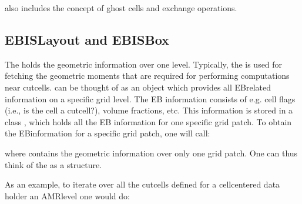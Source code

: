 \documentclass[letterpaper,10pt,english]{sphinxmanual}
\begin{document}
\sphinxAtStartPar
{} also includes the concept of ghost cells and exchange operations.


\subsection{EBISLayout and EBISBox}
\label{\detokenize{Source/ChomboBasics:ebislayout-and-ebisbox}}
\sphinxAtStartPar
The  holds the geometric information over one  level.
Typically, the  is used for fetching the geometric moments that are required for performing computations near cut\sphinxhyphen{}cells.
 can be thought of as an object which provides all EB\sphinxhyphen{}related information on a specific grid level.
The EB information consists of e.g. cell flags (i.e., is the cell a cut\sphinxhyphen{}cell?), volume fractions, etc.
This information is stored in a class , which holds all the EB information for one specific grid patch.
To obtain the EB\sphinxhyphen{}information for a specific grid patch, one will call:

\begin{sphinxVerbatim}[commandchars=\\\{\},formatcom=\scriptsize]
 
    
      \PYG{p}{[}\PYG{p}{]}
\end{sphinxVerbatim}

\sphinxAtStartPar
where  contains the geometric information over only one grid patch.
One can thus think of the  as a  structure.

\sphinxAtStartPar
As an example, to iterate over all the cut\sphinxhyphen{}cells defined for a cell\sphinxhyphen{}centered data holder an AMR\sphinxhyphen{}level one would do:
\end{document}
